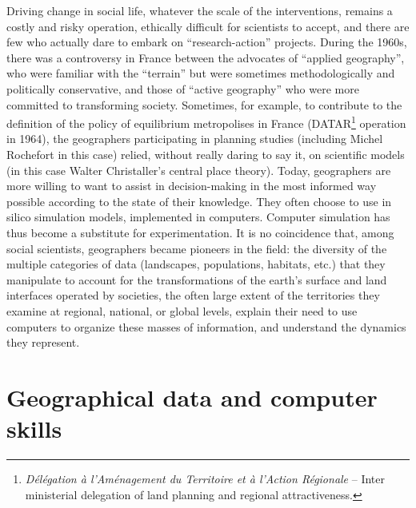 \documentclass[10pt]{article}
\begin{document}
Driving change in social life, whatever the scale of the interventions, remains a costly and risky operation, ethically difficult for scientists to accept, and there are few who actually dare to embark on “research-action” projects. During the 1960s, there was a controversy in France between the advocates of “applied geography”, who were familiar with the “terrain” but were sometimes methodologically and politically conservative, and those of “active geography” who were more committed to transforming society. Sometimes, for example, to contribute to the definition of the policy of equilibrium metropolises in France (DATAR\footnote{\emph{D{\'e}l{\'e}gation {\`a} l'Am{\'e}nagement du Territoire et à l'Action R{\'e}gionale} – Inter ministerial delegation of land planning and regional attractiveness.} operation in 1964), the geographers participating in planning studies (including Michel Rochefort in this case) relied, without really daring to say it, on scientific models (in this case Walter Christaller’s central place theory). Today, geographers are more willing to want to assist in decision-making in the most informed way possible according to the state of their knowledge. They often choose to use in silico simulation models, implemented in computers. Computer simulation has thus become a substitute for experimentation. It is no coincidence that, among social scientists, geographers became pioneers in the field: the diversity of the multiple categories of data (landscapes, populations, habitats, etc.) that they manipulate to account for the transformations of the earth’s surface and land interfaces operated by societies, the often large extent of the territories they examine at regional, national, or global levels, explain their need to use computers to organize these masses of information, and understand the dynamics they represent.


\section{Geographical data and computer skills}
\end{document}
